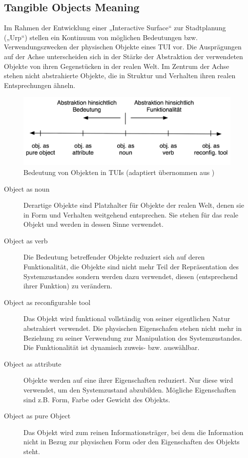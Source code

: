 
\subsection{Tangible Objects Meaning} %
\label{sub:tangible_objects_meaning}

Im Rahmen der Entwicklung einer „Interactive Surface“ zur Stadtplanung („Urp“) stellen \citet{Underkoffler99} ein Kontinuum von möglichen Bedeutungen bzw. Verwendungszwecken der physischen Objekte eines \gls{TUI} vor. Die Ausprägungen auf der Achse unterscheiden sich in der Stärke der Abstraktion der verwendeten Objekte von ihren Gegenstücken in der realen Welt. Im Zentrum der Achse stehen nicht abstrahierte Objekte, die in Struktur und Verhalten ihren realen Entsprechungen ähneln.
\begin{figure}[htbp]
	\centering
		\includegraphics[width=12cm]{img/ImplementierungUeberblick/ObjectMeaning.png}
	\caption[Bedeutung von Objekten in TUIs]{Bedeutung von Objekten in TUIs (adaptiert übernommen aus \citep{Underkoffler99})}
	\label{fig:img_ImplementierungUeberblick_ObjectMeaning}
\end{figure}

\begin{description}
	\item[Object as noun] Derartige Objekte sind Platzhalter für Objekte der realen Welt, denen sie in Form und Verhalten weitgehend entsprechen. Sie stehen für das reale Objekt und werden in dessen Sinne verwendet.
	\item[Object as verb] Die Bedeutung betreffender Objekte reduziert sich auf deren Funktionalität, die Objekte sind nicht mehr Teil der Repräsentation des Systemzustandes sondern werden dazu verwendet, diesen (entsprechend ihrer Funktion) zu verändern.
	\item[Object as reconfigurable tool] Das Objekt wird funktional vollständig von seiner eigentlichen Natur abstrahiert verwendet. Die physischen Eigenschafen stehen nicht mehr in Beziehung zu seiner Verwendung zur Manipulation des Systemzustandes. Die Funktionalität ist dynamisch zuweis- bzw. auswählbar.
	\item[Object as attribute] Objekte werden auf eine ihrer Eigenschaften reduziert. Nur diese wird verwendet, um den Systemzustand abzubilden. Mögliche Eigenschaften sind z.B. Form, Farbe oder Gewicht des Objekts.
	\item[Object as pure Object] Das Objekt wird zum reinen Informationsträger, bei dem die Information nicht in Bezug zur physischen Form oder den Eigenschaften des Objekts steht.
\end{description}

